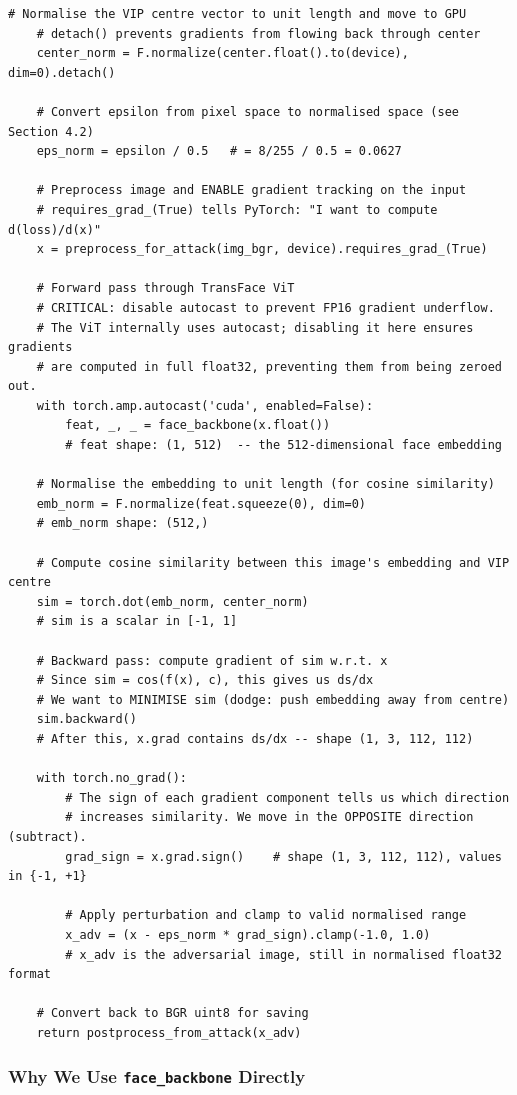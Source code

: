 \documentclass[12pt,a4paper]{article}
\begin{document}
\begin{lstlisting}[caption={attacks/fgsm.py -- Complete listing with line-by-line explanation}]
    # Normalise the VIP centre vector to unit length and move to GPU
    # detach() prevents gradients from flowing back through center
    center_norm = F.normalize(center.float().to(device), dim=0).detach()

    # Convert epsilon from pixel space to normalised space (see Section 4.2)
    eps_norm = epsilon / 0.5   # = 8/255 / 0.5 = 0.0627

    # Preprocess image and ENABLE gradient tracking on the input
    # requires_grad_(True) tells PyTorch: "I want to compute d(loss)/d(x)"
    x = preprocess_for_attack(img_bgr, device).requires_grad_(True)

    # Forward pass through TransFace ViT
    # CRITICAL: disable autocast to prevent FP16 gradient underflow.
    # The ViT internally uses autocast; disabling it here ensures gradients
    # are computed in full float32, preventing them from being zeroed out.
    with torch.amp.autocast('cuda', enabled=False):
        feat, _, _ = face_backbone(x.float())
        # feat shape: (1, 512)  -- the 512-dimensional face embedding

    # Normalise the embedding to unit length (for cosine similarity)
    emb_norm = F.normalize(feat.squeeze(0), dim=0)
    # emb_norm shape: (512,)

    # Compute cosine similarity between this image's embedding and VIP centre
    sim = torch.dot(emb_norm, center_norm)
    # sim is a scalar in [-1, 1]

    # Backward pass: compute gradient of sim w.r.t. x
    # Since sim = cos(f(x), c), this gives us ds/dx
    # We want to MINIMISE sim (dodge: push embedding away from centre)
    sim.backward()
    # After this, x.grad contains ds/dx -- shape (1, 3, 112, 112)

    with torch.no_grad():
        # The sign of each gradient component tells us which direction
        # increases similarity. We move in the OPPOSITE direction (subtract).
        grad_sign = x.grad.sign()    # shape (1, 3, 112, 112), values in {-1, +1}

        # Apply perturbation and clamp to valid normalised range
        x_adv = (x - eps_norm * grad_sign).clamp(-1.0, 1.0)
        # x_adv is the adversarial image, still in normalised float32 format

    # Convert back to BGR uint8 for saving
    return postprocess_from_attack(x_adv)
\end{lstlisting}

\subsubsection{Why We Use \texttt{face\_backbone} Directly}
\end{document}
